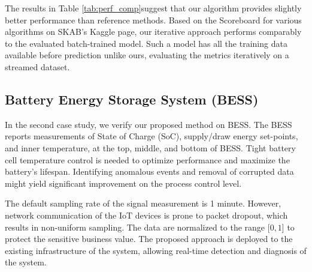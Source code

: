 The results in Table \ref{tab:perf_comp}suggest that our algorithm provides slightly better performance than reference methods. Based on the Scoreboard for various algorithms on SKAB's Kaggle page, our iterative approach performs comparably to the evaluated batch-trained model. Such a model has all the training data available before prediction unlike ours, evaluating the metrics iteratively on a streamed dataset.

\subsection{Battery Energy Storage System (BESS)}\label{AA:BESS}
In the second case study, we verify our proposed method on BESS. The BESS reports measurements of State of Charge (SoC), supply/draw energy set-points, and inner temperature, at the top, middle, and bottom of BESS. Tight battery cell temperature control is needed to optimize performance and maximize the battery's lifespan. Identifying anomalous events and removal of corrupted data might yield significant improvement on the process control level.

The default sampling rate of the signal measurement is 1 minute. However, network communication of the IoT devices is prone to packet dropout, which results in non-uniform sampling. The data are normalized to the range $[0, 1$] to protect the sensitive business value. The proposed approach is deployed to the existing infrastructure of the system, allowing real-time detection and diagnosis of the system.

